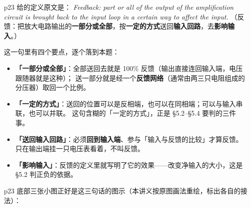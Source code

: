 \documentclass[11pt]{ctexart}
\begin{document}


p23 给的定义原文是：
\textit{Feedback: part or all of the output of the amplification circuit is brought back to the
input loop in a certain way to affect the input.}
（反馈：把放大电路输出的\textbf{一部分或全部}，按\textbf{一定的方式}送回\textbf{输入回路}，去\textbf{影响输入}。）

这一句里有四个要点，逐个落到本题：

\begin{itemize}
\item \textbf{「一部分或全部」}：全部送回去就是 100\% 反馈（输出直接连回输入端，电压跟随器就是这种）；
送一部分就是经一个\textbf{反馈网络}（通常由两三只电阻组成的分压器）取回一个比例。
\item \textbf{「一定的方式」}：送回的位置可以是反相端，也可以在同相端；可以与输入串联，也可以并联。
这句含糊的「一定的方式」，正是 §5.2--§5.4 要判的三件事。
\item \textbf{「送回输入回路」}：必须\textbf{回到输入端}、参与「输入与反馈的比较」才算反馈。
只在输出端挂一只电压表看着，不叫反馈。
\item \textbf{「影响输入」}：反馈的定义里就写明了它的效果——改变净输入的大小，这是 §5.2 判正负的依据。
\end{itemize}

p23 底部三张小图正好是这三句话的图示（本讲义按原图画法重绘，标出各自的接法）：
\end{document}
